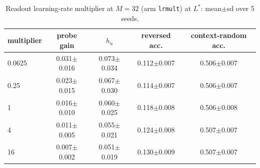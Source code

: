 \begin{table}[htbp]\centering\scriptsize
\caption{Readout learning-rate multiplier at $M=32$ (arm \texttt{lrmult}) at $L^\ast$: mean$\pm$sd over 5 seeds.}\label{tab:exp2_lrmult}
\begin{tabular}{lcccc}\toprule multiplier & probe gain & $h_u$ & reversed acc. & context-random acc. \\ \midrule
0.0625 & 0.031$\pm$0.016 & 0.073$\pm$0.034 & 0.112$\pm$0.007 & 0.506$\pm$0.007 \\
0.25 & 0.023$\pm$0.015 & 0.067$\pm$0.030 & 0.114$\pm$0.007 & 0.506$\pm$0.007 \\
1 & 0.016$\pm$0.010 & 0.060$\pm$0.025 & 0.118$\pm$0.008 & 0.506$\pm$0.008 \\
4 & 0.011$\pm$0.005 & 0.055$\pm$0.021 & 0.124$\pm$0.008 & 0.507$\pm$0.007 \\
16 & 0.007$\pm$0.002 & 0.051$\pm$0.019 & 0.130$\pm$0.009 & 0.507$\pm$0.007 \\
\bottomrule\end{tabular}\end{table}
